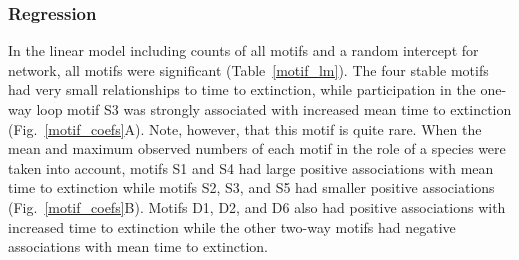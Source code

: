 \documentclass[12pt]{article}
\begin{document}
		\subsubsection*{Regression}


			In the linear model including counts of all motifs and a random intercept for network, all motifs were significant (Table~\ref{motif_lm}).
			The four stable motifs had very small relationships to time to extinction, while participation in the one-way loop motif S3 was strongly associated with increased mean time to extinction (Fig.~\ref{motif_coefs}A).
			Note, however, that this motif is quite rare. 
			When the mean and maximum observed numbers of each motif in the role of a species were taken into account, motifs S1 and S4 had large positive associations with mean time to extinction while motifs S2, 
			S3, and S5 had smaller positive associations (Fig.~\ref{motif_coefs}B).
			Motifs D1, D2, and D6 also had positive associations with increased time to extinction while the other two-way motifs had negative associations with mean time to extinction. 
\end{document}
